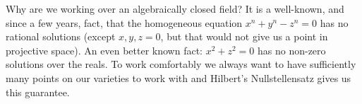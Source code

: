 \begin{remark}
Why are we working over an algebraically closed field?
It is a well-known, and since a few years, fact, that the homogeneous equation $x^n + y^n - z^n = 0$ has no rational solutions (except $x,y,z = 0$, but that would not give us a point in projective space).
An even better known fact: $x^2 + z^2 = 0$ has no non-zero solutions over the reals.
To work comfortably we always want to have sufficiently many points on our varieties to work with and Hilbert's Nullstellensatz gives us this guarantee.
\end{remark}
